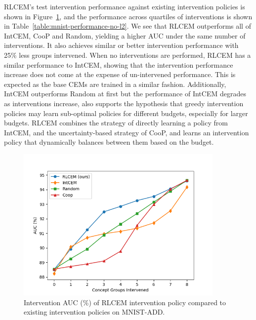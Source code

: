RLCEM's test intervention performance  against 
existing intervention policies is shown in
Figure~\ref{fig:mnist-performance-no-l2},
and the performance across quartiles of interventions is shown in Table~\ref{table:mnist-performance-no-l2}.
We see that 
RLCEM outperforms all of IntCEM, CooP and Random, yielding a 
higher AUC under the same number of interventions. It also achieves similar or better intervention performance with 25\% less groups
intervened.
When no interventions are performed, 
RLCEM has a similar performance to 
IntCEM, showing that the intervention performance
increase does not come at the expense of un-intervened performance.
This is expected as the base CEMs are trained 
in a similar fashion. Additionally, IntCEM outperforms Random
 at first but the performance of 
IntCEM degrades as interventions increase,
also supports the hypothesis that greedy intervention policies 
may learn
sub-optimal policies for different budgets, especially for larger
 budgets.
RLCEM combines the strategy of directly learning a policy from IntCEM,
and the uncertainty-based strategy of CooP, and learns an intervention policy
that dynamically balances between them based on the budget.

\begin{figure}[!ht]
    \centering
    \includegraphics[width=0.9\textwidth]{figs/evaluation/mnist_rlcem_performance.png}
    \caption{
        Intervention AUC (\%) of RLCEM intervention
    policy compared to existing intervention policies on MNIST-ADD.
    }
    \label{fig:mnist-performance-no-l2}
\end{figure}


